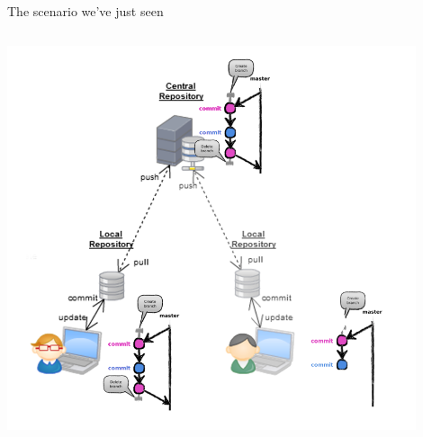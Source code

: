 \begin{frame}[fragile]{The scenario we've just seen}
\begin{columns}
\begin{column}{0.6\textwidth}
\begin{center}
{				\includegraphics[width=0.9\textwidth]{multiuser_remote_delete.png}
			}
	\end{center}
\end{column}
\end{columns}
\end{frame}


